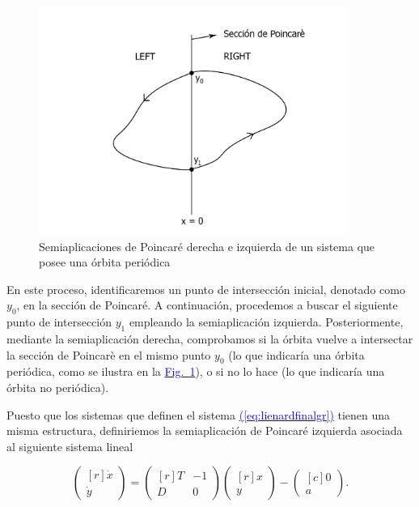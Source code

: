 \documentclass[12pt,a4paper]{report} %
\newcommand{\fref}[1]{\hyperref[#1]{\textcolor{blue}{Fig.~\ref*{#1}}}}
\newcommand{\eref}[1]{\hyperref[#1]{\textcolor{blue}{(\ref*{#1})}}}
\begin{document}
	\begin{figure}[h]
		\centering
		\includegraphics[width=0.9\textwidth]{poincaLR.jpg}
		\caption{Semiaplicaciones de Poincaré derecha e izquierda de un sistema que posee una órbita periódica}
		\label{fig:poincaLR}
	\end{figure}\smallskip
	
	En este proceso, identificaremos un punto de intersección inicial, denotado como $y_0$, en la sección de Poincaré. A continuación, procedemos a buscar el siguiente punto de intersección $y_1$ empleando la semiaplicación izquierda. Posteriormente, mediante la semiaplicación derecha, comprobamos si la órbita vuelve a intersectar la sección de Poincarè en el mismo punto $y_0$ (lo que indicaría una órbita periódica, como se ilustra en la \fref{fig:poincaLR}), o si no lo hace (lo que indicaría una órbita no periódica).
	
	\vspace{0.5cm} Puesto que los sistemas que definen el sistema \eref{eq:lienardfinalgr} tienen una misma estructura, definiriemos la semiaplicación de Poincaré izquierda asociada al siguiente sistema lineal
	
		\begin{equation}
		\label{eq:lienardsolo}
		\begin{pmatrix*}[r]
			\dot{x}\\ \dot{y}
		\end{pmatrix*}= \begin{pmatrix*}[r]
			T & -1 \\ D & 0
		\end{pmatrix*} \begin{pmatrix*}[r]
			x \\ y
		\end{pmatrix*}-\begin{pmatrix*}[c]
			0 \\ a
		\end{pmatrix*}.
	\end{equation}\smallskip
	
\end{document}
